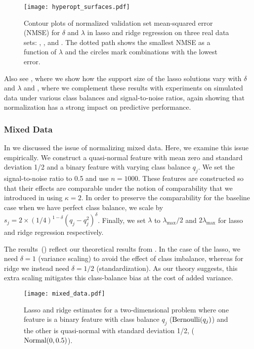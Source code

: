 \begin{figure}[htpb]
  \centering
  \texttt{[image: hyperopt\_surfaces.pdf]}
  \caption{%
    Contour plots of normalized validation set mean-squared error (NMSE) for
    \(\delta\) and \(\lambda\) in lasso and ridge regression on three real data
    sets: , , and . The dotted
    path shows the smallest NMSE as a function of \(\lambda\) and the circles
    mark combinations with the lowest error.
  }
  \label{fig:hyperopt-contours}
\end{figure}

Also see , where we show how the support size of
the lasso solutions vary with \(\delta\) and \(\lambda\) and
, where we complement these results with
experiments on simulated data under various class balances and signal-to-noise ratios,
again showing that normalization has a strong impact on predictive performance.

\subsubsection{Mixed Data}\label{sec:experiments-mixed-data}

In  we discussed the issue of normalizing mixed data. Here, we examine
this issue empirically. We construct a quasi-normal feature with mean zero and standard
deviation 1/2 and a binary feature with varying class balance \(q_j\). We set the
signal-to-noise ratio to 0.5 and use \(n = \num{1000}\). These features are constructed so
that their effects are comparable under the notion of comparability that we introduced in
 using \(\kappa = 2\). In order to preserve the comparability for the
baseline case when we have perfect class balance, we scale by \(s_j = 2 \times
(1/4)^{1-\delta}(q_j-q_j^2)^\delta\). Finally, we set \(\lambda\) to
\(\lambda_\text{max}/2\) and \(2\lambda_\text{max}\) for lasso and ridge regression
respectively.

The results~() reflect our theoretical results from
. In the case of the lasso, we need \(\delta =1\) (variance scaling) to
avoid the effect of class imbalance, whereas for ridge we instead need \(\delta =1/2\)
(standardization). As our theory suggests, this extra scaling mitigates this class-balance
bias at the cost of added variance.

\begin{figure}[htpb]
  \centering
  \texttt{[image: mixed\_data.pdf]}
  \caption{%
    Lasso and ridge estimates for a two-dimensional problem where one feature is a binary
    feature with class balance \(q_j\) (\(\operatorname{Bernoulli}(q_j)\)) and the other is quasi-normal
    with standard deviation 1/2, (\(\operatorname{Normal}(0, 0.5)\)).
  }
  \label{fig:lasso-ridge-comparison}
\end{figure}

